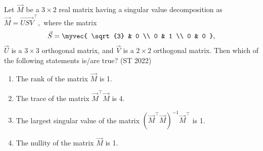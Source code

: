 \item Let $\vec{M}$ be a $3 \times 2$ real matrix having a singular value decomposition as $\vec{M} = \vec{USV}^{\top},$ where the matrix $$
	\vec{S} = \myvec{
	\sqrt{3} & 0 \\
	0 & 1 \\
	0 & 0
},$$
$\vec{U}$ is a $3 \times 3$ orthogonal matrix, and $\vec{V}$ is a $2 \times 2$ orthogonal matrix. Then which of the following statements is/are true?
	\hfill (ST 2022)
\begin{enumerate} 
	\item The rank of the matrix $\vec{M}$ is 1.
	\item The trace of the matrix $\vec{M}^{\top}\vec{M}$ is 4.
	\item The largest singular value of the matrix $(\vec{M}^{\top}\vec{M})^{-1}\vec{M}^{\top}$ is 1.
	\item The nullity of the matrix $\vec{M}$ is 1.
\end{enumerate}
